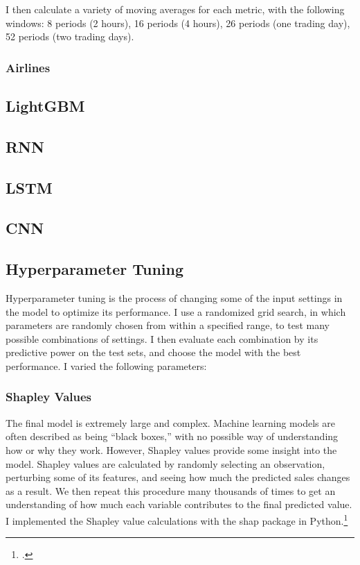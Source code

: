 \documentclass[12pt]{article}
\begin{document}
I then calculate a variety of moving averages for each metric, with the following windows: 8 periods (2 hours), 16 periods (4 hours), 26 periods (one trading day), 52 periods (two trading days).

\subsubsection{Airlines}

\subsection{LightGBM}

\subsection{RNN}

\subsection{LSTM}

\subsection{CNN}

\subsection{Hyperparameter Tuning}
Hyperparameter tuning is the process of changing some of the input settings in the model to optimize its performance. I use a randomized grid search, in which parameters are randomly chosen from within a specified range, to test many possible combinations of settings. I then evaluate each combination by its predictive power on the test sets, and choose the model with the best performance. I varied the following parameters:

\subsubsection{Shapley Values}
The final model is extremely large and complex. Machine learning models are often described as being ``black boxes,'' with no possible way of understanding how or why they work. However, Shapley values provide some insight into the model. Shapley values are calculated by randomly selecting an observation, perturbing some of its features, and seeing how much the predicted sales changes as a result. We then repeat this procedure many thousands of times to get an understanding of how much each variable contributes to the final predicted value. I implemented the Shapley value calculations with the \textsf{shap} package in Python.\footnote{\cite{shap}.}
\end{document}
